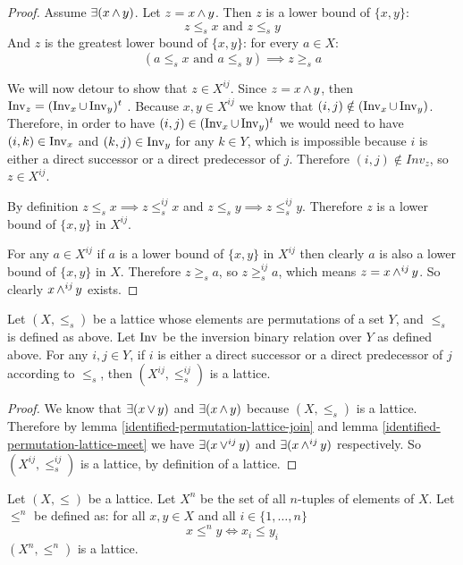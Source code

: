 	\begin{proof}
		Assume $\exists(x \operatorname{\wedge} y)$. Let $z = x \operatorname{\wedge} y$. Then $z$ is a lower bound of $\{x, y\}$:
		\[
			z \le_s x \textrm{ and } z \le_s y
		\]
		And $z$ is the greatest lower bound of $\{x, y\}$: for every $a \in X$:
		\[
			(a \le_s x \textrm{ and } a \le_s y) \implies z \ge_s a
		\]

		We will now detour to show that $z \in X^{ij}$. Since $z = x \operatorname{\wedge} y$, then $\operatorname{Inv}_z = (\operatorname{Inv}_x \cup \operatorname{Inv}_y)^t$ \cite{markowsky1994permutation}. Because $x,y \in X^{ij}$ we know that $(i, j) \notin (\operatorname{Inv}_x \cup \operatorname{Inv}_y)$. Therefore, in order to have $(i, j) \in (\operatorname{Inv}_x \cup \operatorname{Inv}_y)^t$ we would need to have $(i, k) \in \operatorname{Inv}_x$ and $(k, j) \in \operatorname{Inv}_y$ for any $k \in Y$, which is impossible because $i$ is either a direct successor or a direct predecessor of $j$. Therefore $(i, j) \notin Inv_z$, so $z \in X^{ij}$.

		By definition $z \le_s x \implies z \le^{ij}_s x$ and $z \le_s y \implies z \le^{ij}_s y$. Therefore $z$ is a lower bound of $\{x, y\}$ in $X^{ij}$.

		For any $a \in X^{ij}$ if $a$ is a lower bound of $\{x, y\}$ in $X^{ij}$ then clearly $a$ is also a lower bound of $\{x, y\}$ in $X$. Therefore $z \ge_s a$, so $z \ge^{ij}_s a$, which means $z = x \operatorname{\wedge}^{ij} y$. So clearly $x \operatorname{\wedge}^{ij} y$ exists.
	\end{proof}

	\begin{proposition}
		\label{proposition-identification-is-lattice}
		Let $(X, \le_s)$ be a lattice whose elements are permutations of a set $Y$, and $\le_s$ is defined as above. Let $\operatorname{Inv}$ be the inversion binary relation over $Y$ as defined above. For any $i,j \in Y$, if $i$ is either a direct successor or a direct predecessor of $j$ according to $\le_s$, then $(X^{ij}, \le^{ij}_s)$ is a lattice.
	\end{proposition}

	\begin{proof}
		We know that $\exists(x \operatorname{\vee} y)$ and $\exists(x \operatorname{\wedge} y)$ because $(X, \le_s)$ is a lattice. Therefore by lemma \ref{identified-permutation-lattice-join} and lemma \ref{identified-permutation-lattice-meet} we have $\exists(x \operatorname{\vee}^{ij} y)$ and $\exists(x \operatorname{\wedge}^{ij} y)$ respectively. So $(X^{ij}, \le^{ij}_s)$ is a lattice, by definition of a lattice.
	\end{proof}

	\begin{proposition}
		\label{proposition-grid-is-lattice}
		Let $(X, \le)$ be a lattice. Let $X^n$ be the set of all $n$-tuples of elements of $X$. Let $\le^n$ be defined as: for all $x, y \in X$ and all $i \in \{1, \ldots, n\}$
		\[
			x \le^n y \iff x_i \le y_i
		\]
		$(X^n, \le^n)$ is a lattice.
	\end{proposition}

